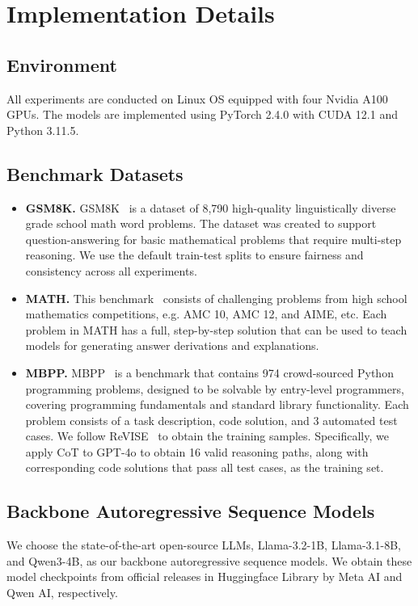 \section{Implementation Details} \label{app: experiment setup}

\subsection{Environment}
All experiments are conducted on Linux OS equipped with four Nvidia A100 GPUs. 
The models are implemented using PyTorch 2.4.0 with CUDA 12.1 and Python 3.11.5. 
\subsection{Benchmark Datasets}
\begin{itemize}[noitemsep, topsep=-1pt, leftmargin=*]
    \item \textbf{GSM8K.} GSM8K~\cite{cobbe2021gsm8k} is a dataset of 8,790 high-quality linguistically diverse grade school math word problems. 
    The dataset was created to support question-answering for basic mathematical problems that require multi-step reasoning.
    We use the default train-test splits to ensure fairness and consistency across all experiments.
    \item  \textbf{MATH.} This benchmark~\cite{hendrycks2021measuring} consists of challenging problems from high school mathematics competitions, e.g. AMC 10, AMC 12, and AIME, etc. 
    Each problem in MATH has a full, step-by-step solution that can be used to teach models for generating answer derivations and explanations.
    \item \textbf{MBPP.} MBPP~\cite{austin2021program} is a benchmark that contains 974 crowd-sourced Python programming problems, designed to be solvable by entry-level programmers, covering programming fundamentals and standard library functionality. 
    Each problem consists of a task description, code solution, and 3 automated test cases.
    We follow ReVISE~\cite{lee2025revise} to obtain the training samples.
    Specifically, we apply CoT to GPT-4o to obtain 16 valid reasoning paths, along with corresponding code solutions that pass all test cases, as the training set.
\end{itemize}
\subsection{Backbone Autoregressive Sequence Models}
We choose the state-of-the-art open-source LLMs, Llama-3.2-1B, Llama-3.1-8B, and Qwen3-4B, as our backbone autoregressive sequence models.
We obtain these model checkpoints from official releases in Huggingface Library by Meta AI and Qwen AI, respectively.

